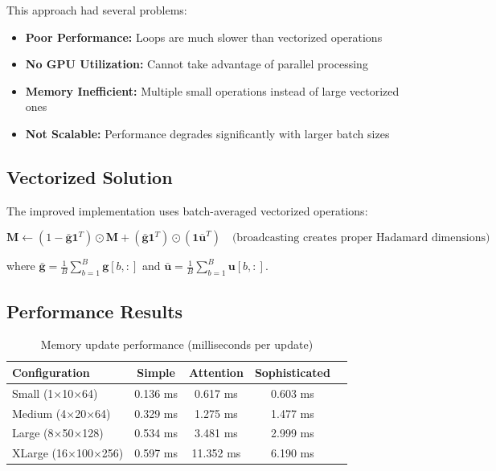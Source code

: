 \documentclass{article}
\begin{document}
This approach had several problems:
\begin{itemize}
\item \textbf{Poor Performance:} Loops are much slower than vectorized operations
\item \textbf{No GPU Utilization:} Cannot take advantage of parallel processing
\item \textbf{Memory Inefficient:} Multiple small operations instead of large vectorized ones
\item \textbf{Not Scalable:} Performance degrades significantly with larger batch sizes
\end{itemize}

\subsection{Vectorized Solution}

The improved implementation uses batch-averaged vectorized operations:

\begin{equation}
\mathbf{M} \leftarrow (1 - \bar{\mathbf{g}} \mathbf{1}^T) \odot \mathbf{M} + (\bar{\mathbf{g}} \mathbf{1}^T) \odot (\mathbf{1} \bar{\mathbf{u}}^T) \quad \text{(broadcasting creates proper Hadamard dimensions)}
\end{equation}

where $\bar{\mathbf{g}} = \frac{1}{B}\sum_{b=1}^{B} \mathbf{g}[b, :]$ and $\bar{\mathbf{u}} = \frac{1}{B}\sum_{b=1}^{B} \mathbf{u}[b, :]$.

\subsection{Performance Results}

\begin{table}[h]
\centering
\begin{tabular}{|l|c|c|c|c|}
\hline
\textbf{Configuration} & \textbf{Simple} & \textbf{Attention} & \textbf{Sophisticated} \\
\hline
Small (1×10×64) & 0.136 ms & 0.617 ms & 0.603 ms \\
Medium (4×20×64) & 0.329 ms & 1.275 ms & 1.477 ms \\
Large (8×50×128) & 0.534 ms & 3.481 ms & 2.999 ms \\
XLarge (16×100×256) & 0.597 ms & 11.352 ms & 6.190 ms \\
\hline
\end{tabular}
\caption{Memory update performance (milliseconds per update)}
\end{table}
\end{document}

